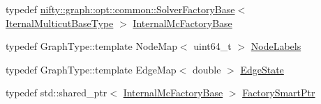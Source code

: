 \begin{DoxyCompactItemize}
typedef \hyperlink{classnifty_1_1graph_1_1opt_1_1common_1_1SolverFactoryBase}{nifty\+::graph\+::opt\+::common\+::\+Solver\+Factory\+Base}$<$ \hyperlink{classnifty_1_1graph_1_1opt_1_1multicut_1_1PerturbAndMap_a42bd629f5bdb2d60985e551861c70a4f}{Iternal\+Multicut\+Base\+Type} $>$ \hyperlink{classnifty_1_1graph_1_1opt_1_1multicut_1_1PerturbAndMap_ae247bf7bd80c2621db557e828198b4f0}{Internal\+Mc\+Factory\+Base}
\item 
typedef Graph\+Type\+::template Node\+Map$<$ uint64\+\_\+t $>$ \hyperlink{classnifty_1_1graph_1_1opt_1_1multicut_1_1PerturbAndMap_a7ea0921a7e9ee7c29772d615a1f0de89}{Node\+Labels}
\item 
typedef Graph\+Type\+::template Edge\+Map$<$ double $>$ \hyperlink{classnifty_1_1graph_1_1opt_1_1multicut_1_1PerturbAndMap_a82a5b6a74aac0c8bc47d5ccfbd06aaf2}{Edge\+State}
\item 
typedef std\+::shared\+\_\+ptr$<$ \hyperlink{classnifty_1_1graph_1_1opt_1_1multicut_1_1PerturbAndMap_ae247bf7bd80c2621db557e828198b4f0}{Internal\+Mc\+Factory\+Base} $>$ \hyperlink{classnifty_1_1graph_1_1opt_1_1multicut_1_1PerturbAndMap_ac2849f0d5d528fb07bf62f213bee8551}{Factory\+Smart\+Ptr}
\end{DoxyCompactItemize}
